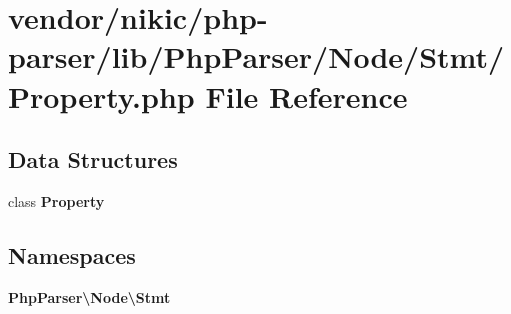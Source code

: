 \section{vendor/nikic/php-\/parser/lib/\+Php\+Parser/\+Node/\+Stmt/\+Property.php File Reference}
\label{_node_2_stmt_2_property_8php}
\subsection*{Data Structures}
\begin{DoxyCompactItemize}
\item 
class {\bf Property}
\end{DoxyCompactItemize}
\subsection*{Namespaces}
\begin{DoxyCompactItemize}
\item 
 {\bf Php\+Parser\textbackslash{}\+Node\textbackslash{}\+Stmt}
\end{DoxyCompactItemize}
